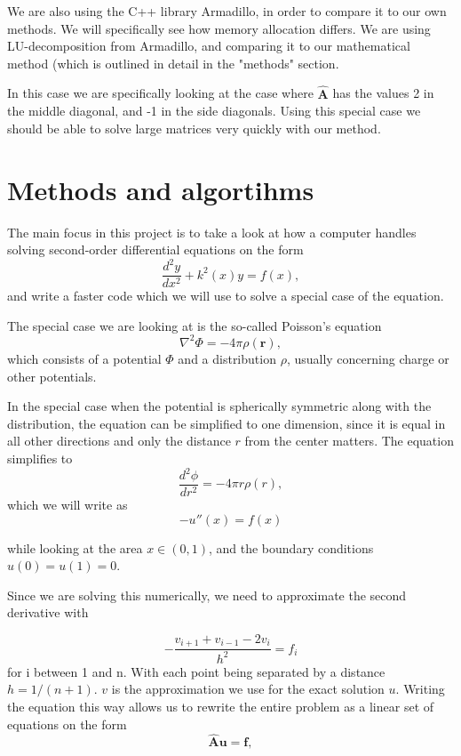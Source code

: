 \documentclass[10pt,showpacs,preprintnumbers,footinbib,amsmath,amssymb,aps,prl,twocolumn,groupedaddress,superscriptaddress,showkeys]{revtex4-1}
\begin{document}
We are also using the C++ library Armadillo, in order to compare it to our own methods. We will specifically see how memory allocation differs. We are using LU-decomposition from Armadillo, and comparing it to our mathematical method (which is outlined in detail in the "methods" section.

In this case we are specifically looking at the case where $\mathbf{\hat{A}}$ has the values 2 in the middle diagonal, and -1 in the side diagonals. Using this special case we should be able to solve large matrices very quickly with our method.

\section{Methods and algortihms}

The main focus in this project is to take a look at how a computer handles solving second-order differential equations on the form 
\begin{equation*}
\frac{d^2y}{dx^2}+k^2(x)y = f(x),
\end{equation*}
and write a faster code which we will use to solve a special case of the equation.

The special case we are looking at is the so-called Poisson's equation 
\begin{equation*}
\nabla^2 \Phi = -4\pi \rho (\mathbf{r}),
\end{equation*}
which consists of a potential $\Phi$ and a distribution $\rho$, usually concerning charge or other potentials.

In the special case when the potential is spherically symmetric along with the distribution, the equation can be simplified to one dimension, since it is equal in all other directions and only the distance $r$ from the center matters. The equation simplifies to 
\begin{equation*}
\frac{d^2\phi}{dr^2}= -4\pi r\rho(r),
\end{equation*}
which we will write as 
\begin{equation*}
-u''(x) = f(x)
\end{equation*}

while looking at the area $x\in(0,1)$,
and the boundary conditions $u(0) = u(1) = 0$.

Since we are solving this numerically, we need to approximate the second derivative with 

\begin{equation*}
   -\frac{v_{i+1}+v_{i-1}-2v_i}{h^2} = f_i
\end{equation*}
for i between 1 and n. 
With each point being separated by a distance $h = 1/(n+1)$. $v$ is the approximation we use for the exact solution $u$. Writing the equation this way allows us to rewrite the entire problem as a linear set of equations on the form 
\begin{equation*}
   \mathbf{\hat{A}}\mathbf{u} = \mathbf{f},
\end{equation*}
\end{document}
